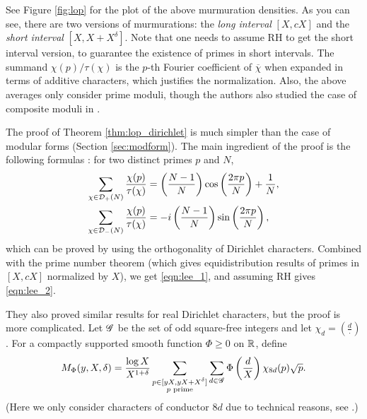 See Figure \ref{fig:lop} for the plot of the above murmuration densities.
As you can see, there are two versions of murmurations: the \emph{long interval} $[X, cX]$ and the \emph{short interval} $[X, X + X^\delta]$.
Note that one needs to assume RH to get the short interval version, to guarantee the existence of primes in short intervals.
The summand $\chi(p) / \tau(\chi)$ is the $p$-th Fourier coefficient of $\overline{\chi}$ when expanded in terms of additive characters, which justifies the normalization.
Also, the above averages only consider prime moduli, though the authors also studied the case of composite moduli in \cite[Section 6.1]{lee2025murmurations}.

The proof of Theorem \ref{thm:lop_dirichlet} is much simpler than the case of modular forms (Section \ref{sec:modform}).
The main ingredient of the proof is the following formulas \cite[Lemma 2.6]{lee2025murmurations}: for two distinct primes $p$ and $N$,
\begin{align}
    \sum_{\chi \in \mathcal{D}_{+}(N)} \frac{\chi(p)}{\tau(\chi)} &= \left(\frac{N-1}{N}\right) \cos \left(\frac{2 \pi p}{N}\right) + \frac{1}{N}, \\
    \sum_{\chi \in \mathcal{D}_{-}(N)} \frac{\chi(p)}{\tau(\chi)} &= -i\left(\frac{N-1}{N}\right) \sin \left(\frac{2 \pi p}{N}\right),
\end{align}
which can be proved by using the orthogonality of Dirichlet characters.
Combined with the prime number theorem (which gives equidistribution results of primes in $[X, cX]$ normalized by $X$), we get \eqref{eqn:lee_1}, and assuming RH gives \eqref{eqn:lee_2}.

They also proved similar results for real Dirichlet characters, but the proof is more complicated.
Let $\mathscr{G}$ be the set of odd square-free integers and let $\chi_{d} = \left(\frac{d}{\cdot}\right)$.
For a compactly supported smooth function $\Phi \ge 0$ on $\mathbb{R}$, define
\begin{equation}
    M_{\Phi}(y, X, \delta) = \frac{\log X}{X^{1 + \delta}} \sum_{\substack{p \in [yX, yX + X^\delta] \\ p \text{ prime}}} \sum_{d \in \mathscr{G}} \Phi\left(\frac{d}{X}\right) \chi_{8d}(p) \sqrt{p}.
\end{equation}
(Here we only consider characters of conductor $8d$ due to technical reasons, see \cite{soundararajan2000nonvanishing}.)

